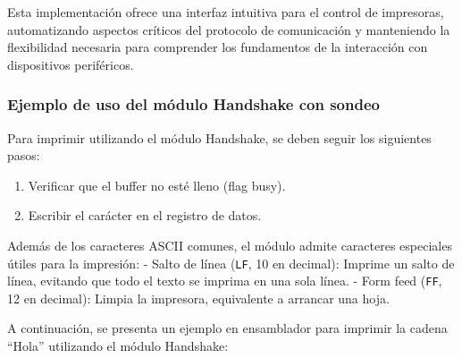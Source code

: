\documentclass[12pt,oneside]{templates/unerthesis}
\providecommand{\tightlist}{%
  \setlength{\itemsep}{0pt}\setlength{\parskip}{0pt}}
\begin{document}
Esta implementación ofrece una interfaz intuitiva para el control de impresoras, automatizando aspectos críticos del protocolo de comunicación y manteniendo la flexibilidad necesaria para comprender los fundamentos de la interacción con dispositivos periféricos.

\hypertarget{ejemplo-de-uso-del-muxf3dulo-handshake-con-sondeo}{%
\subsubsection{Ejemplo de uso del módulo Handshake con sondeo}\label{ejemplo-de-uso-del-muxf3dulo-handshake-con-sondeo}}

Para imprimir utilizando el módulo Handshake, se deben seguir los siguientes pasos:

\begin{enumerate}
\def\labelenumi{\arabic{enumi}.}
\tightlist
\item
  Verificar que el buffer no esté lleno (flag busy).
\item
  Escribir el carácter en el registro de datos.
\end{enumerate}

Además de los caracteres ASCII comunes, el módulo admite caracteres especiales útiles para la impresión:
- Salto de línea (\texttt{LF}, 10 en decimal): Imprime un salto de línea, evitando que todo el texto se imprima en una sola línea.
- Form feed (\texttt{FF}, 12 en decimal): Limpia la impresora, equivalente a arrancar una hoja.

A continuación, se presenta un ejemplo en ensamblador para imprimir la cadena ``Hola'' utilizando el módulo Handshake:
\end{document}
